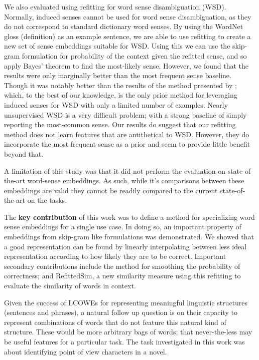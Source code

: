 \documentclass{book}
\begin{document}
We also evaluated using refitting for word sense disambiguation (WSD).
Normally, induced senses cannot be used for word sense disambiguation, as they do not correspond to standard dictionary word senses.
By using the WordNet gloss (definition) as an example sentence, we are able to use refitting to create a new set of sense embeddings suitable for WSD.
Using this we can use the skip-gram formulation for probability of the context given the  refitted sense, and so apply Bayes' theorem to find the most-likely sense.
However, we found that the results were only marginally better than the most frequent sense baseline.
Though it was notably better than the results of the method presented by \citet{agirre2006}; which, to the best of our knowledge, is the only prior method for leveraging induced senses for WSD with only a limited number of examples.
Nearly unsupervised WSD is a very difficult problem; with a strong baseline of simply reporting the most-common sense.
Our results do suggest that our refitting method does not learn features that are antithetical to WSD.
However, they do incorporate the most frequent sense as a prior and seem to provide little benefit beyond that.

A limitation of this study was that it did not perform the evaluation on state-of-the-art word-sense embeddings.
As such, while it's comparisons between these embeddings are valid they cannot be readily compared to the current state-of-the-art on the tasks.


The \textbf{key contribution} of this work was to define a method for specializing word sense embeddings for a single use case.
In doing so, an important property of embeddings from skip-gram like formulations was demonstrated.
We showed that a good representation can be found by linearly interpolating between less ideal representation according to how likely they are to be correct.
Important secondary contributions include the method for smoothing the probability of correctness;
and RefittedSim, a new similarity measure using this refitting to evaluate the similarity of words in context.



Given the success of LCOWEs for representing meaningful linguistic structures (sentences and phrases),
a natural follow up question is on their capacity to represent combinations of words that do not feature this natural kind of structure.
These would be more arbitrary bags of words; that never-the-less may be useful features for a particular task.
The task investigated in this work was about identifying point of view characters in a novel.
\end{document}

